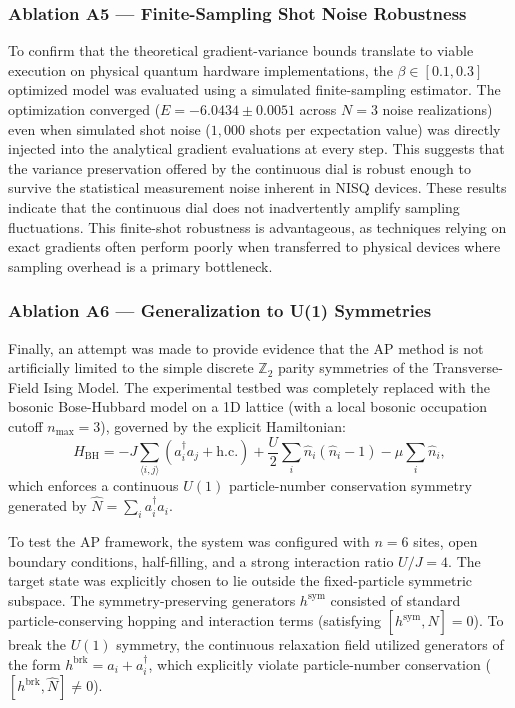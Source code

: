 \documentclass[pdflatex,sn-mathphys-num]{sn-jnl}
\theoremstyle{thmstyleone}
\theoremstyle{thmstyletwo}
\theoremstyle{thmstylethree}
\begin{document}
\subsubsection{Ablation A5 --- Finite-Sampling Shot Noise Robustness}
To confirm that the theoretical gradient-variance bounds translate to viable execution on physical quantum hardware implementations, the $\beta \in [0.1, 0.3]$ optimized model was evaluated using a simulated finite-sampling estimator. The optimization converged ($E = -6.0434 \pm 0.0051$ across $N=3$ noise realizations) even when simulated shot noise ($1,000$ shots per expectation value) was directly injected into the analytical gradient evaluations at every step. This suggests that the variance preservation offered by the continuous dial is robust enough to survive the statistical measurement noise inherent in NISQ devices. These results indicate that the continuous dial does not inadvertently amplify sampling fluctuations. This finite-shot robustness is advantageous, as techniques relying on exact gradients often perform poorly when transferred to physical devices where sampling overhead is a primary bottleneck.

\subsubsection{Ablation A6 --- Generalization to U(1) Symmetries}
Finally, an attempt was made to provide evidence that the AP method is not artificially limited to the simple discrete $\mathbb{Z}_2$ parity symmetries of the Transverse-Field Ising Model. The experimental testbed was completely replaced with the bosonic Bose-Hubbard model on a 1D lattice (with a local bosonic occupation cutoff $n_{\max} = 3$), governed by the explicit Hamiltonian:
\begin{equation}
H_{\text{BH}} = -J \sum_{\langle i, j \rangle} (a_i^\dagger a_j + \mathrm{h.c.}) + \frac{U}{2} \sum_i \hat{n}_i (\hat{n}_i - 1) - \mu \sum_i \hat{n}_i,
\end{equation}
which enforces a continuous $U(1)$ particle-number conservation symmetry generated by $\hat{N} = \sum_i a_i^\dagger a_i$. 

To test the AP framework, the system was configured with $n=6$ sites, open boundary conditions, half-filling, and a strong interaction ratio $U/J = 4$. The target state was explicitly chosen to lie outside the fixed-particle symmetric subspace. The symmetry-preserving generators $h^{\mathrm{sym}}$ consisted of standard particle-conserving hopping and interaction terms (satisfying $[h^{\mathrm{sym}}, \hat{N}] = 0$). To break the $U(1)$ symmetry, the continuous relaxation field utilized generators of the form $h^{\mathrm{brk}} = a_i + a_i^\dagger$, which explicitly violate particle-number conservation ($[h^{\mathrm{brk}}, \hat{N}] \neq 0$). 
\end{document}
